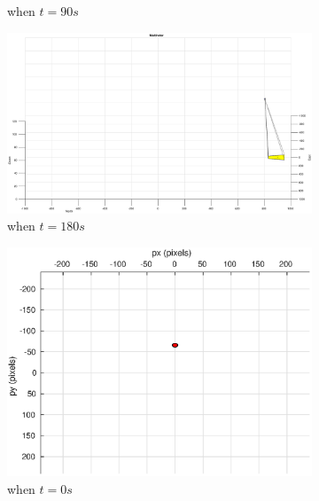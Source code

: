 \begin{figure}[htbp]
\begin{subfigure}[t]{0.32\linewidth}
		\caption{when $t=90s$}
	\end{subfigure}
	\begin{subfigure}[t]{0.32\linewidth}
		\includegraphics[width=\textwidth]{images/chapter4/image_UAV_5mps_180s}
		\caption{when $t=180s$}
	\end{subfigure}
	\begin{subfigure}[t]{0.32\linewidth}
		\includegraphics[width=\textwidth]{images/chapter4/image_camera_5mps}
		\caption{when $t=0s$}
	\end{subfigure}
	\begin{subfigure}[t]{0.32\linewidth}

\end{subfigure}
\end{figure}
